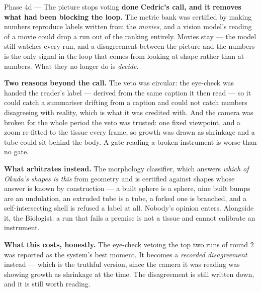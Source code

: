 \documentclass[11pt,a4paper]{article}
\newcommand{\dn}{\textcolor{good}{\textbf{done}}}
\begin{document}
\begin{phasebox}{Phase 4d --- The picture stops voting \hfill \dn}
\textbf{Cedric's call, and it removes what had been blocking the loop.} The metric bank was
certified by making numbers reproduce labels written from the \emph{movies}, and a vision model's
reading of a movie could drop a run out of the ranking entirely. Movies stay --- the model still
watches every run, and a disagreement between the picture and the numbers is the only signal in
the loop that comes from looking at shape rather than at numbers. What they no longer do is
\emph{decide}.

\textbf{Two reasons beyond the call.} The veto was circular: the eye-check was handed the
reader's label --- derived from the same caption it then read --- so it could catch a
summariser drifting from a caption and could not catch numbers disagreeing with reality, which is
what it was credited with. And the camera was broken for the whole period the veto was trusted:
one fixed viewpoint, and a zoom re-fitted to the tissue every frame, so growth was drawn as
shrinkage and a tube could sit behind the body. A gate reading a broken instrument is worse than
no gate.

\textbf{What arbitrates instead.} The morphology classifier, which answers \emph{which of Okuda's
shapes is this} from geometry and is certified against shapes whose answer is known by
construction --- a built sphere is a sphere, nine built bumps are an undulation, an extruded tube
is a tube, a forked one is branched, and a self-intersecting shell is refused a label at all.
Nobody's opinion enters. Alongside it, the Biologist: a run that fails a premise is not a tissue
and cannot calibrate an instrument.

\textbf{What this costs, honestly.} The eye-check vetoing the top two runs of round 2 was reported
as the system's best moment. It becomes a \emph{recorded disagreement} instead --- which is the
truthful version, since the camera it was reading was showing growth as shrinkage at the time.
The disagreement is still written down, and it is still worth reading.
\end{phasebox}
\end{document}
